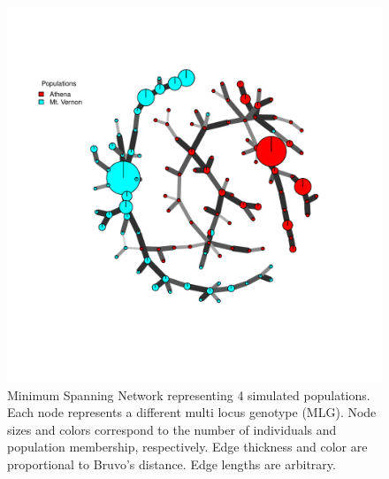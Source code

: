 \documentclass[letterpaper]{article}\usepackage[]{graphicx}\usepackage[]{color}
\newenvironment{knitrout}{}{} %
\begin{document}
\begin{figure}[ht!]
  \centering
  \caption{\footnotesize Minimum Spanning Network representing 4 simulated populations. Each node represents a different multi locus genotype (MLG). Node sizes and colors correspond to the number of individuals and population membership, respectively. Edge thickness and color are proportional to Bruvo's distance. Edge lengths are arbitrary.}
  \label{mst_poppr}
\begin{knitrout}\footnotesize
{}\color{fgcolor}

{\centering \includegraphics[width=0.8\linewidth]{figure/poppr_msn_fig} 

}



\end{knitrout}

\end{figure}
\newpage
%
%
%
\end{document}
